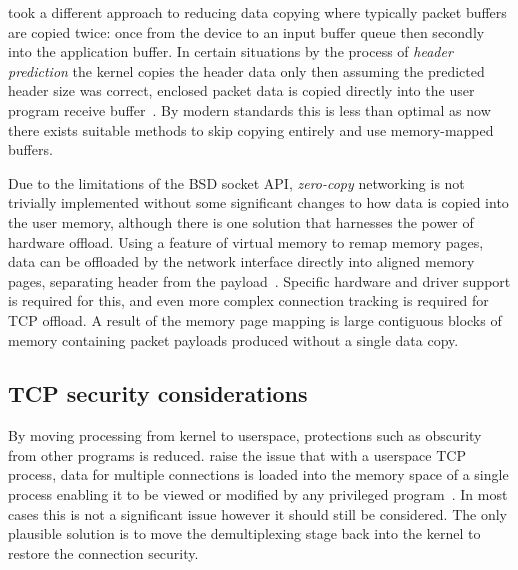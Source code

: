 \documentclass[11pt,a4paper,british]{bhamarticle}
\begin{document}
\citeauthor{braun:inria-00074040} took a different approach to reducing data copying where typically packet buffers are copied twice: once from the device to an input buffer queue then secondly into the application buffer. In certain situations by the process of \textit{header prediction} the kernel copies the header data only then assuming the predicted header size was correct, enclosed packet data is copied directly into the user program receive buffer~\cite[4.1]{braun:inria-00074040}. By modern standards this is less than optimal as now there exists suitable methods to skip copying entirely and use memory-mapped buffers.

Due to the limitations of the BSD socket API, \textit{zero-copy} networking is not trivially implemented without some significant changes to how data is copied into the user memory, although there is one solution that harnesses the power of hardware offload. Using a feature of virtual memory to remap memory pages, data can be offloaded by the network interface directly into aligned memory pages, separating header from the payload~\cite[2.3]{chase2001end}. Specific hardware and driver support is required for this, and even more complex connection tracking is required for TCP offload. A result of the memory page mapping is large contiguous blocks of memory containing packet payloads produced without a single data copy.

\subsection{TCP security considerations}
By moving processing from kernel to userspace, protections such as obscurity from other programs is reduced. \citeauthor{braun:inria-00074040} raise the issue that with a userspace TCP process, data for multiple connections is loaded into the memory space of a single process enabling it to be viewed or modified by any privileged program~\cite[1, 2.1]{braun:inria-00074040}. In most cases this is not a significant issue however it should still be considered. The only plausible solution is to move the demultiplexing stage back into the kernel to restore the connection security.

\end{document}
